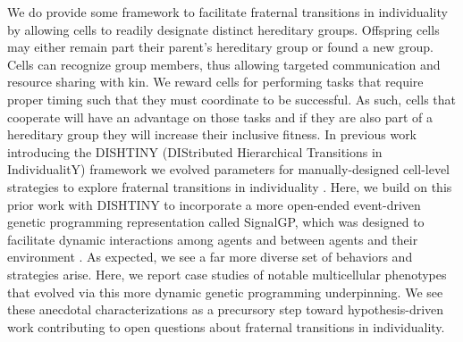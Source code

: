 We do provide some framework to facilitate fraternal transitions in individuality by allowing cells to readily designate distinct hereditary groups.
Offspring cells may either remain part their parent's hereditary group or found a new group.
Cells can recognize group members, thus allowing targeted communication and resource sharing with kin.
We reward cells for performing tasks that require proper timing such that they must coordinate to be successful.
As such, cells that cooperate will have an advantage on those tasks and if they are also part of a hereditary group they will increase their inclusive fitness.
In previous work introducing the DISHTINY (DIStributed Hierarchical Transitions in IndividualitY) framework we evolved parameters for manually-designed cell-level strategies to explore fraternal transitions in individuality \citep{moreno2019toward}.
Here, we build on this prior work with DISHTINY to incorporate a more open-ended event-driven genetic programming representation called SignalGP, which was designed to facilitate dynamic interactions among agents and between agents and their environment \citep{lalejini2018evolving}.
As expected, we see a far more diverse set of behaviors and strategies arise.
Here, we report case studies of notable multicellular phenotypes that evolved via this more dynamic genetic programming underpinning.
We see these anecdotal characterizations as a precursory step toward hypothesis-driven work contributing to open questions about fraternal transitions in individuality.
